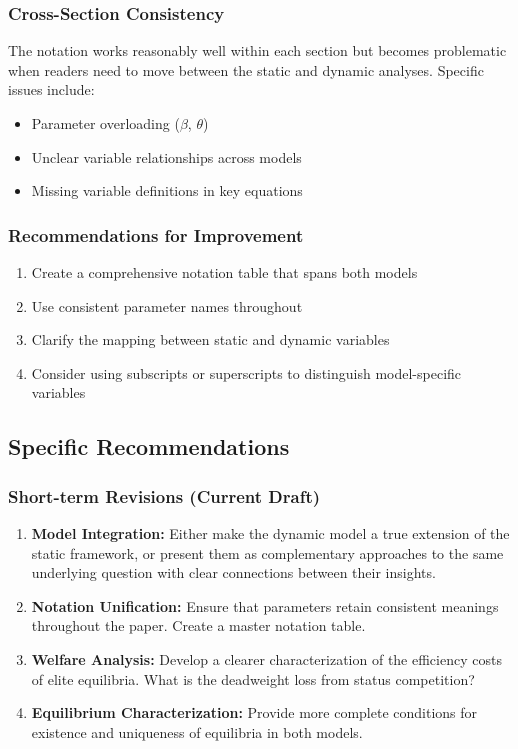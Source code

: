 \documentclass[12pt,letterpaper]{article}
\begin{document}
\subsubsection{Cross-Section Consistency}

The notation works reasonably well within each section but becomes problematic when readers need to move between the static and dynamic analyses. Specific issues include:

\begin{itemize}
	\item Parameter overloading ($\beta$, $\theta$)
	\item Unclear variable relationships across models
	\item Missing variable definitions in key equations
\end{itemize}

\subsubsection{Recommendations for Improvement}

\begin{enumerate}
	\item Create a comprehensive notation table that spans both models
	\item Use consistent parameter names throughout
	\item Clarify the mapping between static and dynamic variables
	\item Consider using subscripts or superscripts to distinguish model-specific variables
\end{enumerate}

\subsection{Specific Recommendations}

\subsubsection{Short-term Revisions (Current Draft)}

\begin{enumerate}
	\item \textbf{Model Integration:} Either make the dynamic model a true extension of the static framework, or present them as complementary approaches to the same underlying question with clear connections between their insights.
	
	\item \textbf{Notation Unification:} Ensure that parameters retain consistent meanings throughout the paper. Create a master notation table.
	
	\item \textbf{Welfare Analysis:} Develop a clearer characterization of the efficiency costs of elite equilibria. What is the deadweight loss from status competition?
	
	\item \textbf{Equilibrium Characterization:} Provide more complete conditions for existence and uniqueness of equilibria in both models.
\end{enumerate}
\end{document}
